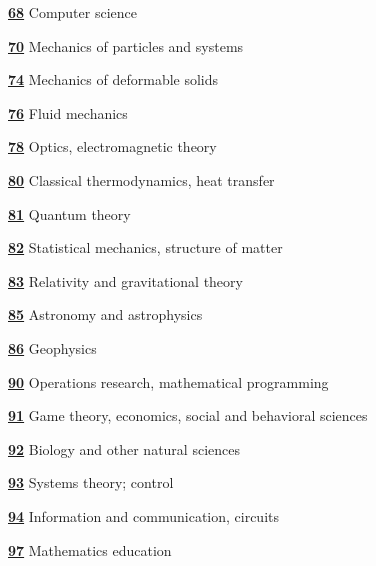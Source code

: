 \documentclass[letterpaper]{article}
\begin{document}
\begin{multicols}{2}
\begin{description}
\item []\hyperref[68-XX]{\textbf{68}}  Computer science  
\item []\hyperref[70-XX]{\textbf{70}}  Mechanics of particles and systems  
\item []\hyperref[74-XX]{\textbf{74}}  Mechanics of deformable solids 
\item []\hyperref[76-XX]{\textbf{76}}  Fluid mechanics  
\item []\hyperref[78-XX]{\textbf{78}}  Optics, electromagnetic theory  
\item []\hyperref[80-XX]{\textbf{80}}  Classical thermodynamics, heat transfer  
\item []\hyperref[81-XX]{\textbf{81}}  Quantum theory 
\item []\hyperref[82-XX]{\textbf{82}}  Statistical mechanics, structure of 
matter 
\item []\hyperref[83-XX]{\textbf{83}}  Relativity and gravitational theory 
\item []\hyperref[85-XX]{\textbf{85}}  Astronomy and astrophysics 
\item []\hyperref[86-XX]{\textbf{86}}  Geophysics 
\item []\hyperref[90-XX]{\textbf{90}}  Operations research, mathematical 
programming 
\item []\hyperref[91-XX]{\textbf{91}}  Game theory, economics, social and 
behavioral 
sciences
\item []\hyperref[92-XX]{\textbf{92}}  Biology and other natural sciences 
\item []\hyperref[93-XX]{\textbf{93}}  Systems theory; control  
\item []\hyperref[94-XX]{\textbf{94}}  Information and communication, circuits 
\item []\hyperref[97-XX]{\textbf{97}}  Mathematics education 
\end{description}
\end{multicols}
\newpage
\normalsize
\end{document}
